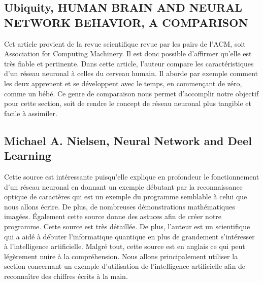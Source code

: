 \documentclass[letterpaper,10pt,french]{sphinxmanual}
\begin{document}
\subsection{Ubiquity, HUMAN BRAIN AND NEURAL NETWORK BEHAVIOR, A COMPARISON}
\label{\detokenize{biblio_commented:ubiquity-human-brain-and-neural-network-behavior-a-comparison}}
Cet article provient de la revue scientifique revue par les pairs de l’ACM, soit Association for Computing Machinery.
Il est donc possible d’affirmer qu’elle est très fiable et pertinente. Dans cette article, l’auteur compare
les caractéristiques d’un réseau neuronal à celles du cerveau humain. Il aborde par exemple comment les deux apprenent et
se développent avec le temps, en commençant de zéro, comme un bébé. Ce genre de comparaison nous permet d’accomplir notre objectif
pour cette section, soit de rendre le concept de réseau neuronal plus tangible et facile à assimiler.


\subsection{Michael A. Nielsen, Neural Network and Deel Learning}
\label{\detokenize{biblio_commented:michael-a-nielsen-neural-network-and-deel-learning}}
Cette source est intéressante puisqu’elle explique en profondeur le fonctionnement
d’un réseau neuronal en donnant un exemple débutant par la reconnaissance optique
de caractères qui est un exemple du programme semblable à celui que nous allons
écrire. De plus, de nombreuses démonstrations mathématiques imagées. Également
cette source donne des astuces afin de créer notre programme. Cette source est
très détaillée. De plus, l’auteur est un scientifique qui a aidé à débuter
l’informatique quantique en plus de grandement s’intéresser à l’intelligence
artificielle. Malgré tout, cette source est en anglais ce qui peut
légèrement nuire à la compréhension. Nous allons principalement utiliser la
section concernant un exemple d’utilisation de l’intelligence
artificielle afin de reconnaître des chiffres écrits à la main.







\renewcommand{\indexname}{Index}
\printindex
\end{document}
